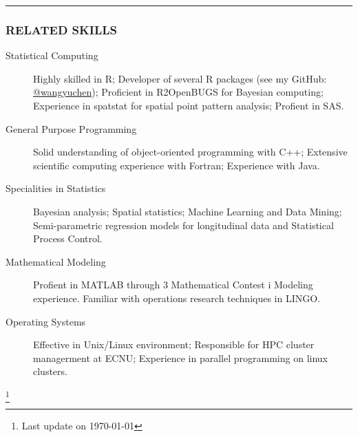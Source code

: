 \documentclass[11pt]{article}
\begin{document}
\vspace{0.2em}
\hrule

\subsubsection*{\centering RELATED SKILLS}

\begin{description}
	\item[Statistical Computing] Highly skilled in R; Developer of several R packages (see my GitHub: \href{https://www.github.com/wangyuchen}{@wangyuchen}); Proficient in R2OpenBUGS for Bayesian computing; Experience in spatstat for spatial point pattern analysis; Profient in SAS.
	\item[General Purpose Programming] Solid understanding of object-oriented programming with C++; Extensive scientific computing experience with Fortran; Experience with Java.
	\item[Specialities in Statistics] Bayesian analysis; Spatial statistics; Machine Learning and Data Mining; Semi-parametric regression models for longitudinal data and Statistical Process Control.
	\item[Mathematical Modeling] Profient in MATLAB through 3 Mathematical Contest i Modeling experience. Familiar with operations research techniques in LINGO.
	\item[Operating Systems] Effective in Unix/Linux environment; Responsible for HPC cluster managerment at ECNU; Experience in parallel programming on linux clusters.
\end{description}

\let\thefootnote\relax\footnote{Last update on \today}
\end{document}
